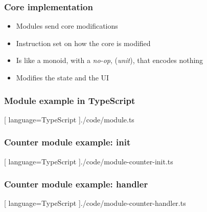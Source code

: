 \begin{frame}
  \frametitle{Core implementation}
  \begin{itemize}
    \pause
    \item Modules send core modifications
    \pause
    \item Instruction set on how the core is modified
    \pause
    \item Is like a monoid, with a \textit{no-op}, (\textit{unit}), that encodes
    nothing
    \pause
    \item Modifies the state and the UI
  \end{itemize}
\end{frame}

\begin{frame}
  \frametitle{Module example in TypeScript}
  \begin{center}
    
    [ language=TypeScript
    ]{./code/module.ts}
  \end{center}
\end{frame}

\begin{frame}
  \frametitle{Counter module example: init}
  \begin{center}
    
    [ language=TypeScript
    ]{./code/module-counter-init.ts}
  \end{center}
\end{frame}

\begin{frame}
  \frametitle{Counter module example: handler}
  \begin{center}
    
    [ language=TypeScript
    ]{./code/module-counter-handler.ts}
  \end{center}
\end{frame}